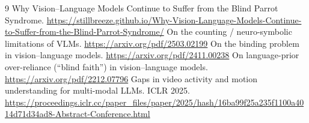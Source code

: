 \documentclass[11pt]{article}
\begin{document}
\begin{thebibliography}{9}
 Why Vision--Language Models Continue to Suffer from the Blind Parrot Syndrome.
  \url{https://stillbreeze.github.io/Why-Vision-Language-Models-Continue-to-Suffer-from-the-Blind-Parrot-Syndrome/}
 On the counting / neuro-symbolic limitations of VLMs.
  \url{https://arxiv.org/pdf/2503.02199}
 On the binding problem in vision--language models.
  \url{https://arxiv.org/pdf/2411.00238}
 On language-prior over-reliance (``blind faith'') in vision--language models.
  \url{https://arxiv.org/pdf/2212.07796}
 Gaps in video activity and motion understanding for multi-modal LLMs. ICLR 2025.
  \url{https://proceedings.iclr.cc/paper_files/paper/2025/hash/16ba99f25a235f1100a4014d71d34ad8-Abstract-Conference.html}
\end{thebibliography}
\end{document}
